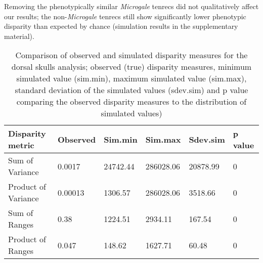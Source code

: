 \documentclass[12pt,a4paper]{article}
\begin{document}
Removing the phenotypically similar \textit{Microgale} tenrecs did not qualitatively affect our results; the non-\textit{Microgale} tenrecs still show significantly lower phenotypic disparity than expected by chance (simulation results in the supplementary material). 



\begin{table}[H]				%

\centering
\caption{Comparison of observed and simulated disparity measures for the dorsal skulls analysis; observed (true) disparity measures, minimum simulated value (sim.min), maximum simulated value (sim.max), standard deviation of the simulated values (sdev.sim) and p value comparing the observed disparity measures to the distribution of simulated values)}

\begin{tabular}[t]{l l l l l l }		%
\hline
\textbf{Disparity metric} & \textbf{Observed} & \textbf{Sim.min} & \textbf{Sim.max} & \textbf{Sdev.sim} & \textbf{p value} \\
\hline
Sum of Variance & 0.0017 & 24742.44 & 286028.06 & 20878.99 &	0\\
Product of Variance	& 0.00013 &	1306.57 &	286028.06 &	3518.66 & 0\\
Sum of Ranges &	0.38 &	1224.51 &	2934.11 &	167.54 & 0 \\
Product of Ranges & 0.047 &	148.62 & 1627.71 &	60.48 &	0\\
\hline
\end{tabular}
\label{skdorssims} %
\end{table}
\end{document}
